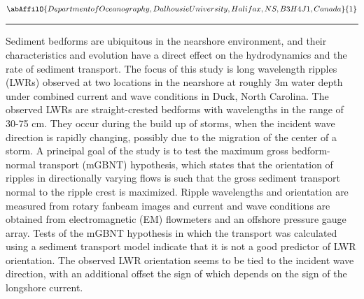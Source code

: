 \begin{minipage}{\linewidth}\begin{center}\begin{minipage}{\linewidth}
   \vspace{2 mm} \begin{center}
    \vspace{2 mm}\begin{center}
  
  $\abAffilO{Department of Oceanography, Dalhousie University, Halifax, NS, B3H 4J1, Canada}{1}$

  \end{center}
  \vspace{2 mm}
  \end{center}\end{minipage}\end{center}
  \begin{center}\rule{0.70\linewidth}{0.5 pt}\end{center}
  \begin{minipage}{\linewidth}
\noindent Sediment bedforms are ubiquitous in the nearshore environment, and their characteristics and evolution have a direct effect on the hydrodynamics and the rate of sediment transport. The focus of this study is long wavelength ripples (LWRs) observed at two locations in the nearshore at roughly 3m water depth under combined current and wave conditions in Duck, North Carolina. The observed LWRs are straight-crested bedforms with wavelengths in the range of 30-75 cm. They occur during the build up of storms, when the incident wave direction is rapidly changing, possibly due to the migration of the center of a storm. A principal goal of the study is to test the maximum gross bedform-normal transport (mGBNT) hypothesis, which states that the orientation of ripples in directionally varying flows is such that the gross sediment transport normal to the ripple crest is maximized. Ripple wavelengths and orientation are measured from rotary fanbeam images and current and wave conditions are obtained from electromagnetic (EM) flowmeters and an offshore pressure gauge array. Tests of the mGBNT hypothesis in which the transport was calculated using a sediment transport model indicate that it is not a good predictor of LWR orientation. The observed LWR orientation seems to be tied to the incident wave direction, with an additional offset the sign of which depends on the sign of the longshore current.
\end{minipage}\end{minipage}
